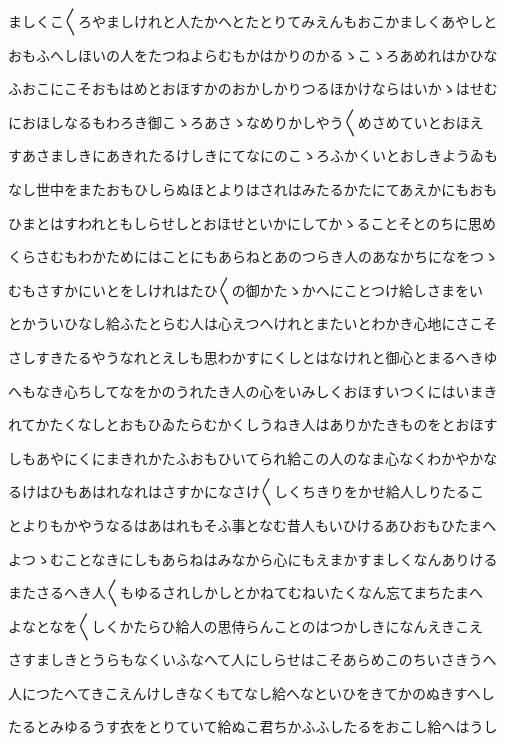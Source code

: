 \documentclass[a4paper,11pt,landscape]{ltjtarticle}
\begin{document}
ましくこ〱ろやましけれと人たかへとたとりてみえんもおこかましくあやしと
\par\medskip
おもふへしほいの人をたつねよらむもかはかりのかるゝこゝろあめれはかひな
\par\medskip
ふおこにこそおもはめとおほすかのおかしかりつるほかけならはいかゝはせむ
\par\medskip
におほしなるもわろき御こゝろあさゝなめりかしやう〱めさめていとおほえ
\par\medskip
すあさましきにあきれたるけしきにてなにのこゝろふかくいとおしきようゐも
\par\medskip
なし世中をまたおもひしらぬほとよりはされはみたるかたにてあえかにもおも
\par\medskip
ひまとはすわれともしらせしとおほせといかにしてかゝることそとのちに思め
\par\medskip
くらさむもわかためにはことにもあらねとあのつらき人のあなかちになをつゝ
\par\medskip
むもさすかにいとをしけれはたひ〱の御かたゝかへにことつけ給しさまをい
\par\medskip
とかういひなし給ふたとらむ人は心えつへけれとまたいとわかき心地にさこそ
\par\medskip
さしすきたるやうなれとえしも思わかすにくしとはなけれと御心とまるへきゆ
\par\medskip
へもなき心ちしてなをかのうれたき人の心をいみしくおほすいつくにはいまき
\par\medskip
れてかたくなしとおもひゐたらむかくしうねき人はありかたきものをとおほす
\par\medskip
しもあやにくにまきれかたふおもひいてられ給この人のなま心なくわかやかな
\par\medskip
るけはひもあはれなれはさすかになさけ〱しくちきりをかせ給人しりたるこ
\par\medskip
とよりもかやうなるはあはれもそふ事となむ昔人もいひけるあひおもひたまへ
\par\medskip
よつゝむことなきにしもあらねはみなから心にもえまかすましくなんありける
\par\medskip
またさるへき人〱もゆるされしかしとかねてむねいたくなん忘てまちたまへ
\par\medskip
よなとなを〱しくかたらひ給人の思侍らんことのはつかしきになんえきこえ
\par\medskip
さすましきとうらもなくいふなへて人にしらせはこそあらめこのちいさきうへ
\par\medskip
人につたへてきこえんけしきなくもてなし給へなといひをきてかのぬきすへし
\par\medskip
たるとみゆるうす衣をとりていて給ぬこ君ちかふふしたるをおこし給へはうし
\end{document}
